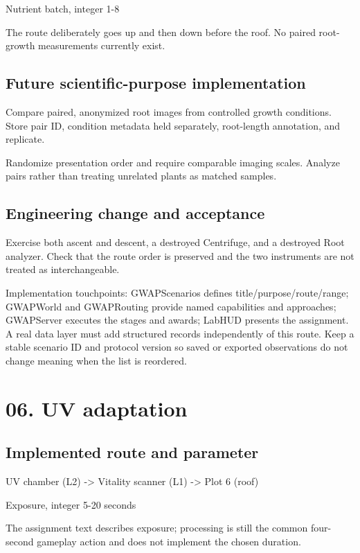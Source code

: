 Nutrient batch, integer 1-8

The route deliberately goes up and then down before the roof.\allowbreak{} No paired root-growth measurements currently exist.\allowbreak{}

\subsection{Future scientific-purpose implementation}
Compare paired, anonymized root images from controlled growth conditions.\allowbreak{} Store pair ID, condition metadata held separately, root-length annotation, and replicate.\allowbreak{}

Randomize presentation order and require comparable imaging scales.\allowbreak{} Analyze pairs rather than treating unrelated plants as matched samples.\allowbreak{}

\subsection{Engineering change and acceptance}
Exercise both ascent and descent, a destroyed Centrifuge, and a destroyed Root analyzer.\allowbreak{} Check that the route order is preserved and the two instruments are not treated as interchangeable.\allowbreak{}

Implementation touchpoints: GWAPScenarios defines title/\allowbreak{}purpose/\allowbreak{}route/\allowbreak{}range; GWAPWorld and GWAPRouting provide named capabilities and approaches; GWAPServer executes the stages and awards; LabHUD presents the assignment.\allowbreak{} A real data layer must add structured records independently of this route.\allowbreak{} Keep a stable scenario ID and protocol version so saved or exported observations do not change meaning when the list is reordered.\allowbreak{}

\section{06.\allowbreak{} UV adaptation}
\subsection{Implemented route and parameter}
UV chamber (L2) -> Vitality scanner (L1) -> Plot 6 (roof)

Exposure, integer 5-20 seconds

The assignment text describes exposure; processing is still the common four-second gameplay action and does not implement the chosen duration.\allowbreak{}

